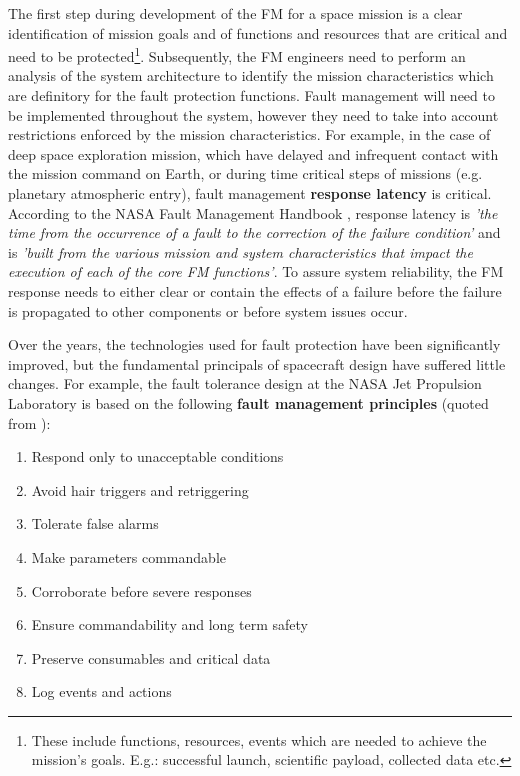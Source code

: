 The first step during development of the FM for a space mission is a clear
identification of mission goals and of functions and resources that are critical
and need to be protected\footnote{These include functions, resources, events
which are needed to achieve the mission's goals. E.g.: successful launch,
scientific payload, collected data etc. }. Subsequently, the FM engineers need
to perform an analysis of the system architecture to identify the mission
characteristics which are definitory for the fault protection functions. Fault
management will need to be implemented throughout the system, however they need
to take into account restrictions enforced by the mission characteristics. For
example, in the case of deep space exploration mission, which have delayed and
infrequent contact with the mission command on Earth, or during time critical
steps of missions (e.g. planetary atmospheric entry), fault management
\textbf{response latency} is critical. According to the NASA Fault Management
Handbook \cite{nasa-fm-handbook}, response latency is \textit{'the time from the
occurrence of a fault to the correction of the failure condition'} and is
\textit{'built from the various mission and system characteristics that impact
the execution of each of the core FM functions'}. To assure system reliability,
the FM response needs to either clear or contain the effects of a failure before
the failure is propagated to other components or before system issues occur.

Over the years, the technologies used for fault protection have been
significantly improved, but the fundamental principals of spacecraft design
have suffered little changes. For example, the fault tolerance design at the
NASA Jet Propulsion Laboratory is based on the following \textbf{fault
management principles} (quoted from \cite{fm-jpl}):
\begin{enumerate}
  \item Respond only to unacceptable conditions
  \item Avoid hair triggers and retriggering
  \item Tolerate false alarms
  \item Make parameters commandable
  \item Corroborate before severe responses
  \item Ensure commandability and long term safety
  \item Preserve consumables and critical data
  \item Log events and actions
\end{enumerate}

